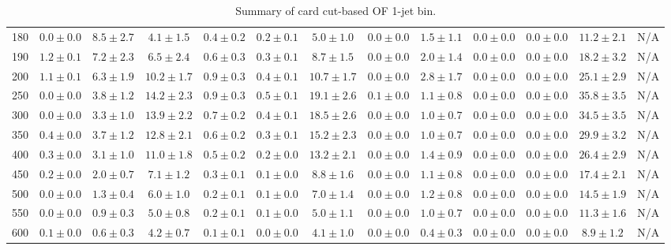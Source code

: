 \begin{table}
{\begin{center}
\begin{tabular}{l | c c | c c c c c c c c  | c c}
180 & $0.0\pm0.0$ & $8.5\pm2.7$ & $4.1\pm1.5$ & $0.4\pm0.2$ & $0.2\pm0.1$ & $5.0\pm1.0$ & $0.0\pm0.0$ & $1.5\pm1.1$ & $0.0\pm0.0$ & $0.0\pm0.0$ & $11.2\pm2.1$ & N/A \\
190 & $1.2\pm0.1$ & $7.2\pm2.3$ & $6.5\pm2.4$ & $0.6\pm0.3$ & $0.3\pm0.1$ & $8.7\pm1.5$ & $0.0\pm0.0$ & $2.0\pm1.4$ & $0.0\pm0.0$ & $0.0\pm0.0$ & $18.2\pm3.2$ & N/A \\
200 & $1.1\pm0.1$ & $6.3\pm1.9$ & $10.2\pm1.7$ & $0.9\pm0.3$ & $0.4\pm0.1$ & $10.7\pm1.7$ & $0.0\pm0.0$ & $2.8\pm1.7$ & $0.0\pm0.0$ & $0.0\pm0.0$ & $25.1\pm2.9$ & N/A \\
250 & $0.0\pm0.0$ & $3.8\pm1.2$ & $14.2\pm2.3$ & $0.9\pm0.3$ & $0.5\pm0.1$ & $19.1\pm2.6$ & $0.1\pm0.0$ & $1.1\pm0.8$ & $0.0\pm0.0$ & $0.0\pm0.0$ & $35.8\pm3.5$ & N/A \\
300 & $0.0\pm0.0$ & $3.3\pm1.0$ & $13.9\pm2.2$ & $0.7\pm0.2$ & $0.4\pm0.1$ & $18.5\pm2.6$ & $0.0\pm0.0$ & $1.0\pm0.7$ & $0.0\pm0.0$ & $0.0\pm0.0$ & $34.5\pm3.5$ & N/A \\
350 & $0.4\pm0.0$ & $3.7\pm1.2$ & $12.8\pm2.1$ & $0.6\pm0.2$ & $0.3\pm0.1$ & $15.2\pm2.3$ & $0.0\pm0.0$ & $1.0\pm0.7$ & $0.0\pm0.0$ & $0.0\pm0.0$ & $29.9\pm3.2$ & N/A \\
400 & $0.3\pm0.0$ & $3.1\pm1.0$ & $11.0\pm1.8$ & $0.5\pm0.2$ & $0.2\pm0.0$ & $13.2\pm2.1$ & $0.0\pm0.0$ & $1.4\pm0.9$ & $0.0\pm0.0$ & $0.0\pm0.0$ & $26.4\pm2.9$ & N/A \\
450 & $0.2\pm0.0$ & $2.0\pm0.7$ & $7.1\pm1.2$ & $0.3\pm0.1$ & $0.1\pm0.0$ & $8.8\pm1.6$ & $0.0\pm0.0$ & $1.1\pm0.8$ & $0.0\pm0.0$ & $0.0\pm0.0$ & $17.4\pm2.1$ & N/A \\
500 & $0.0\pm0.0$ & $1.3\pm0.4$ & $6.0\pm1.0$ & $0.2\pm0.1$ & $0.1\pm0.0$ & $7.0\pm1.4$ & $0.0\pm0.0$ & $1.2\pm0.8$ & $0.0\pm0.0$ & $0.0\pm0.0$ & $14.5\pm1.9$ & N/A \\
550 & $0.0\pm0.0$ & $0.9\pm0.3$ & $5.0\pm0.8$ & $0.2\pm0.1$ & $0.1\pm0.0$ & $5.0\pm1.1$ & $0.0\pm0.0$ & $1.0\pm0.7$ & $0.0\pm0.0$ & $0.0\pm0.0$ & $11.3\pm1.6$ & N/A \\
600 & $0.1\pm0.0$ & $0.6\pm0.3$ & $4.2\pm0.7$ & $0.1\pm0.1$ & $0.0\pm0.0$ & $4.1\pm1.0$ & $0.0\pm0.0$ & $0.4\pm0.3$ & $0.0\pm0.0$ & $0.0\pm0.0$ & $8.9\pm1.2$ & N/A \\
\hline
\end{tabular}
\end{center}
}
\caption{Summary of card cut-based OF 1-jet bin.}
\end{table}
